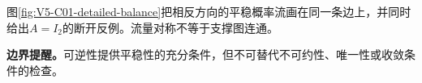\documentclass[UTF8,a4paper,11pt,openany]{ctexbook}
\begin{document}
\setcounter{page}{709}
\setcounter{chapter}{30}
\setcounter{figure}{5}
\pagestyle{headings}
图\ref{fig:V5-C01-detailed-balance}把相反方向的平稳概率流画在同一条边上，并同时给出$A=I_2$的断开反例。流量对称不等于支撑图连通。

\textbf{边界提醒。}可逆性提供平稳性的充分条件，但不可替代不可约性、唯一性或收敛条件的检查。
\end{document}

